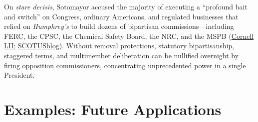 \documentclass[12pt]{article}
\begin{document}
On \textit{stare decisis}, Sotomayor accused the majority of executing a ``profound bait and switch'' on Congress, ordinary Americans, and regulated businesses that relied on \textit{Humphrey's} to build dozens of bipartisan commissions---including FERC, the CPSC, the Chemical Safety Board, the NRC, and the MSPB (\href{https://www.law.cornell.edu/supremecourt/text/25-332}{Cornell LII}; \href{https://www.scotusblog.com/2026/06/court-allows-trump-to-fire-ftc-commissioner-and-overturns-major-restraint-on-presidential-power/}{SCOTUSblog}). Without removal protections, statutory bipartisanship, staggered terms, and multimember deliberation can be nullified overnight by firing opposition commissioners, concentrating unprecedented power in a single President.

\section{Examples: Future Applications}
\end{document}
